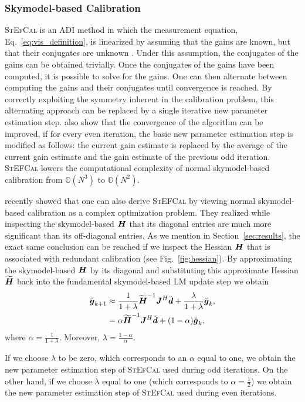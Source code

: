 \documentclass[useAMS,usenatbib]{mn2e}
\newcommand{\bg}{\bmath{g}}
\newcommand{\bd}{\bmath{d}}
\newcommand{\bJ}{\bmath{J}}
\newcommand{\bH}{\bmath{H}}
\begin{document}
\subsubsection{Skymodel-based Calibration}
\label{sec:sbc}
\textsc{StEfCal} is an ADI method in which the measurement equation, Eq.~\eqref{eq:vis_definition}, is linearized by assuming that the gains are known, but
that their conjugates are unknown \citep{Mitchell:MWA-cal,Salvini2014}. Under this assumption, the conjugates of the gains can be obtained trivially. Once the conjugates of the gains have been computed, it is possible to solve for the gains. One can then alternate between computing the gains and their conjugates until convergence
is reached. By correctly exploiting the symmetry inherent in the calibration problem, this alternating approach can be replaced by a single iterative new parameter estimation step. \cite{Salvini2014} also show that
the convergence of the algorithm can be improved, if for every even iteration, the basic new parameter estimation step is modified as follows: the current gain estimate is replaced by the average of the current gain estimate and the gain estimate of the previous odd iteration.
\textsc{StEFCal} lowers the computational complexity of normal skymodel-based calibration from $\mathbb{O}(N^3)$ to $\mathbb{O}(N^2)$. 

\citet{Smirnov2015} recently showed that one can also derive \textsc{StEFCal} by viewing normal skymodel-based calibration as a complex optimization problem.
They realized while inspecting the skymodel-based $\bH$ that its diagonal entries are much more significant than its off-diagonal entries.
As we mention in Section~\ref{sec:results}, the exact same conclusion can be reached if we inspect the Hessian $\bH$ that is associated with redundant calibration (see Fig.~\ref{fig:hessian}). 
By approximating the skymodel-based $\bH$ by its diagonal and substituting this approximate Hessian $\widetilde{\bH}$ back into the fundamental skymodel-based LM update step we obtain \citep{Smirnov2015} 
\begin{align}
\breve{\bg}_{k+1} &\approx \frac{1}{1+\lambda}\widetilde{\bH}^{-1}\bJ^H\breve{\bd} + \frac{\lambda}{1+\lambda} \breve{\bg}_k,\label{eq:stef_lambda}\\
 &= \alpha \widetilde{\bH}^{-1}\bJ^H\breve{\bd} + (1-\alpha)\breve{\bg}_k, \label{eq:stef_alpha}  
\end{align}
where $\alpha = \frac{1}{1+\lambda}$. Moreover, $\lambda = \frac{1-\alpha}{\alpha}$.

If we choose $\lambda$ to be zero, which corresponds to an $\alpha$ equal to one, we obtain the new parameter estimation step of \textsc{StEfCal} used during odd iterations. On the other hand, if we choose $\lambda$ equal to one (which corresponds
to $\alpha=\frac{1}{2}$) we obtain the new parameter estimation step of \textsc{StEfCal} used during even iterations. 
\end{document}
